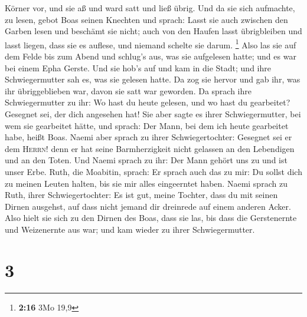 Körner vor, und sie aß und ward satt und ließ übrig.  Und
da sie sich aufmachte, zu lesen, gebot Boas seinen Knechten und sprach:
Lasst sie auch zwischen den Garben lesen und beschämt sie nicht;
 auch von den Haufen lasst übrigbleiben und lasst liegen,
dass sie es auflese, und niemand schelte sie darum. \footnote{\textbf{2:16}
  3Mo 19,9}  Also las sie auf dem Felde bis zum Abend und
schlug's aus, was sie aufgelesen hatte; und es war bei einem Epha
Gerste.  Und sie hob's auf und kam in die Stadt; und ihre
Schwiegermutter sah es, was sie gelesen hatte. Da zog sie hervor und gab
ihr, was ihr übriggeblieben war, davon sie satt war geworden.
 Da sprach ihre Schwiegermutter zu ihr: Wo hast du heute
gelesen, und wo hast du gearbeitet? Gesegnet sei, der dich angesehen
hat! Sie aber sagte es ihrer Schwiegermutter, bei wem sie gearbeitet
hätte, und sprach: Der Mann, bei dem ich heute gearbeitet habe, heißt
Boas.  Naemi aber sprach zu ihrer Schwiegertochter:
Gesegnet sei er dem \textsc{Herrn}! denn er hat seine Barmherzigkeit
nicht gelassen an den Lebendigen und an den Toten. Und Naemi sprach zu
ihr: Der Mann gehört uns zu und ist unser Erbe.  Ruth,
die Moabitin, sprach: Er sprach auch das zu mir: Du sollst dich zu
meinen Leuten halten, bis sie mir alles eingeerntet haben.
 Naemi sprach zu Ruth, ihrer Schwiegertochter: Es ist
gut, meine Tochter, dass du mit seinen Dirnen ausgehst, auf dass nicht
jemand dir dreinrede auf einem anderen Acker.  Also hielt
sie sich zu den Dirnen des Boas, dass sie las, bis dass die Gerstenernte
und Weizenernte aus war; und kam wieder zu ihrer Schwiegermutter.

\hypertarget{section-2}{%
\section{3}\label{section-2}}

